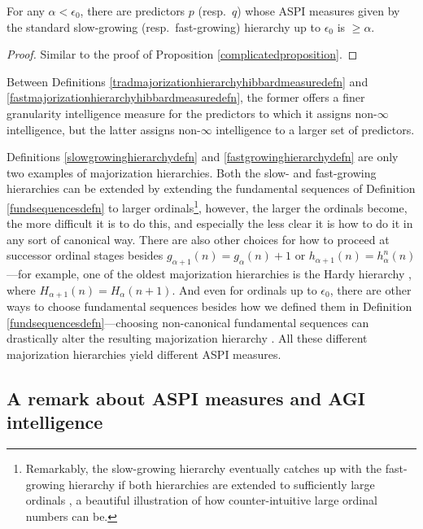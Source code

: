 \documentclass[twoside,11pt]{article}
\begin{document}
\begin{proposition}
    For any $\alpha<\epsilon_0$, there are predictors $p$ (resp.\ $q$)
    whose ASPI measures
    given by the standard slow-growing (resp.\ fast-growing)
    hierarchy up to $\epsilon_0$
    is $\geq \alpha$.
\end{proposition}

\begin{proof}
    Similar to the proof of Proposition \ref{complicatedproposition}.
\end{proof}

Between Definitions \ref{tradmajorizationhierarchyhibbardmeasuredefn} and
\ref{fastmajorizationhierarchyhibbardmeasuredefn}, the former offers a finer
granularity
intelligence measure for the predictors to which it assigns non-$\infty$
intelligence, but the latter assigns non-$\infty$ intelligence to a larger
set of predictors.

Definitions \ref{slowgrowinghierarchydefn}
and \ref{fastgrowinghierarchydefn} are only two
examples of
majorization hierarchies. Both the slow- and fast-growing hierarchies can be
extended by extending the fundamental sequences of Definition
\ref{fundsequencesdefn} to larger ordinals\footnote{Remarkably,
the slow-growing hierarchy eventually catches up with the fast-growing hierarchy
if both hierarchies are extended to sufficiently large ordinals
\citep{wainer1989slow, girard1981pi12}, a beautiful illustration of
how counter-intuitive
large ordinal numbers can be.}, however, the larger
the ordinals become, the more difficult it is to do this, and especially the less
clear it is how to do it in any sort of canonical way.
There are also other choices for how to proceed at successor ordinal stages besides
$g_{\alpha+1}(n)=g_\alpha(n)+1$ or $h_{\alpha+1}(n)=h^n_\alpha(n)$---for example,
one of the oldest majorization hierarchies is the Hardy hierarchy
\citep{hardy1904theorem}, where $H_{\alpha+1}(n)=H_\alpha(n+1)$.
And even for ordinals up to $\epsilon_0$,
there are other ways to choose fundamental sequences besides how we defined them in
Definition \ref{fundsequencesdefn}---choosing non-canonical fundamental sequences can
drastically alter the resulting majorization hierarchy \citep{weiermann1997sometimes}.
All these different majorization hierarchies yield different ASPI measures.

\subsection{A remark about ASPI measures and AGI intelligence}
\end{document}
